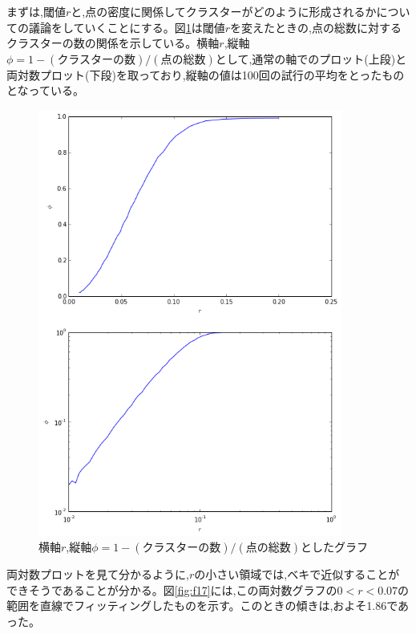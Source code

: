 まずは,閾値$r$と,点の密度に関係してクラスターがどのように形成されるかについての議論をしていくことにする。図\ref{fig:f16}は閾値$r$を変えたときの,点の総数に対するクラスターの数の関係を示している。横軸$r$,縦軸$\phi = 1- (\text{クラスターの数})/(\text{点の総数})$として,通常の軸でのプロット(上段)と両対数プロット(下段)を取っており,縦軸の値は100回の試行の平均をとったものとなっている。
\begin{figure}[H]
    \begin{center}
        \includegraphics[width=10cm]{../img/r_phi_1.png}
        \caption{横軸$r$,縦軸$\phi = 1- (\text{クラスターの数})/(\text{点の総数})$としたグラフ}
        \label{fig:f16}
    \end{center}
\end{figure}
両対数プロットを見て分かるように,$r$の小さい領域では,ベキで近似することができそうであることが分かる。図\ref{fig:f17}には,この両対数グラフの$0<r<0.07$の範囲を直線でフィッティングしたものを示す。このときの傾きは,およそ1.86であった。
